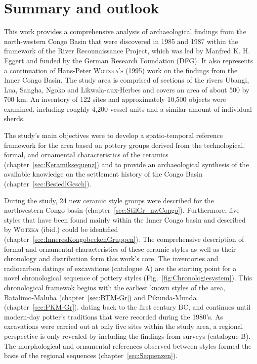 \vspace{1.5em}

\section*{Summary and outlook}
\begin{multicols}{2}
\raggedcolumns
\noindent This work provides a comprehensive analysis of archaeological findings from the north-western Congo Basin that were discovered in 1985 and 1987 within the framework of the River Reconnaissance Project, which was led by Manfred K. H. Eggert and funded by the German Research Foundation (DFG). It also represents a continuation of Hans-Peter\textsc{ Wotzka’s} (1995) work on the findings from the Inner Congo Basin. The study area is comprised of sections of the rivers Ubangi, Lua, Sangha, Ngoko and Likwala-aux-Herbes and covers an area of about 500 by 700 km. An inventory of 122 sites and approximately 10,500 objects were examined, including roughly 4,200 vessel units and a similar amount of individual sherds.

The study’s main objectives were to develop a spatio-temporal reference framework for the area based on pottery groups derived from the technological, formal, and ornamental characteristics of the ceramics (chapter~\ref{sec:Keramiksequenz}) and to provide an archaeological synthesis of the available knowledge on the settlement history of the Congo Basin (chapter~\ref{sec:BesiedlGesch}).

During the study, 24 new ceramic style groups were described for the northwestern Congo basin (chapter~\ref{sec:StilGr_nwCongo}). Furthermore, five styles that have been found mainly within the Inner Congo basin and described by \textsc{Wotzka} (ibid.) could be identified (chapter~\ref{sec:InneresKongobeckenGruppen}). The comprehensive description of formal and ornamental characteristics of these ceramic styles as well as their chronology and distribution form this work’s core. The inventories and radiocarbon datings of excavations (catalogue A) are the starting point for a novel chronological sequence of pottery styles (Fig.~\ref{fig:Chronologiesystem}). This chronological framewok begins with the earliest known styles of the area, Batalimo-Maluba (chapter~\ref{sec:BTM-Gr}) and Pikunda-Munda (chapter~\ref{sec:PKM-Gr}), dating back to the first century BC, and continues until modern-day potter’s traditions that were recorded during the 1980’s. As excavations were carried out at only five sites within the study area, a regional perspective is only revealed by including the findings from surveys (catalogue B). The morphological and ornamental references observed between styles formed the basis of the regional sequences (chapter~\ref{sec:Sequenzen}).


\end{multicols}

